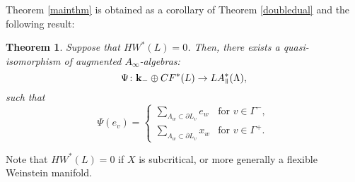 \documentclass{gtpart}
\newtheorem{thm}{Theorem}
\renewcommand{\k}{\mathbf{k}}
\renewcommand{\parallel}{{\mkern3mu\vphantom{\perp}\vrule depth 0pt\mkern2mu\vrule depth
0pt\mkern3mu}}
\begin{document}
Theorem \ref{mainthm} is obtained as a  corollary of Theorem \ref{doubledual} and the following
result:

\begin{thm} \label{ainfiso} Suppose that $HW^*(L) =0$. Then, there exists a quasi-isomorphism of augmented $A_\infty$-algebras:
    \[\Psi\colon \k_{-} \oplus CF^*(L) \to LA_{\parallel}^*(\Lambda), \] 
such that 
\[ 
\Psi(e_{v})=
\begin{cases}
\sum_{\Lambda_{w}\subset\partial L_{v}}e_{w} &\text{for $v\in\Gamma^{-}$},\\
\sum_{\Lambda_{w}\subset\partial L_{v}}x_{w} &\text{for $v\in\Gamma^{+}$}.
\end{cases}
\]
   
\end{thm}

Note that $HW^*(L)=0$ if $X$ is subcritical, or more generally a flexible Weinstein
manifold. 
\end{document}

